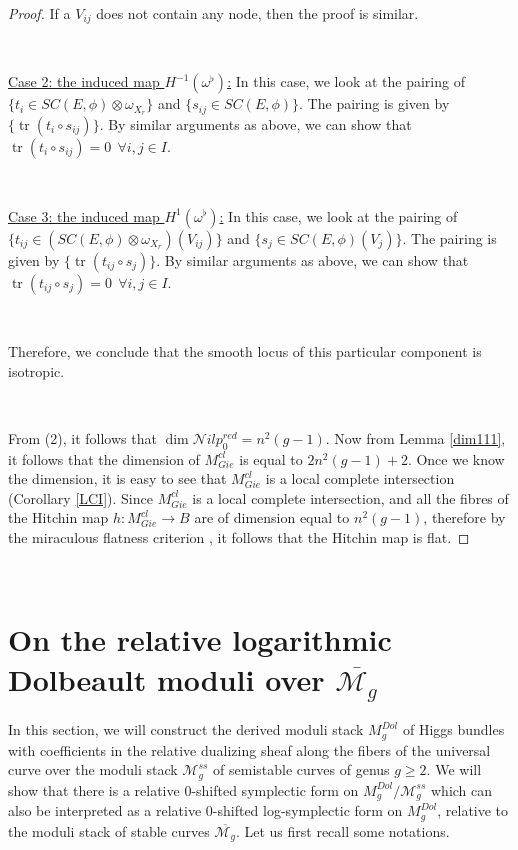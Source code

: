 \documentclass[11pt]{amsart}
\DeclareMathOperator{\tr}{tr}
\theoremstyle{plain}
\numberwithin{equation}{section}
\theoremstyle{definition}
\theoremstyle{plain}
\begin{document}
\begin{proof}
If a $V_{ij}$ does not contain any node, then the proof is similar. 

\

\underline{Case 2: the induced map $H^{-1}(\omega^{\flat})$:} In this case, we look at the pairing of $\{t_i\in SC(E, \phi)\otimes \omega_{X_r}\}$ and $\{s_{ij}\in SC(E, \phi)\}$. The pairing is given by $\{\tr(t_i\circ s_{ij})\}$. By similar arguments as above, we can show that $\tr(t_i\circ s_{ij})=0~~\forall i, j\in I$.

\

\underline{Case 3: the induced map $H^1(\omega^{\flat})$:} In this case, we look at the pairing of $\{t_{ij}\in (SC(E, \phi)\otimes \omega_{X_r})(V_{ij})\}$ and $\{s_j\in SC(E, \phi)(V_j)\}$. The pairing is given by $\{\tr(t_{ij}\circ s_j)\}$. By similar arguments as above, we can show that $\tr(t_{ij}\circ s_j)=0~~\forall i,j\in I$.

\

Therefore, we conclude that the smooth locus of this particular component is isotropic.

\

 From (2), it follows that $ \dim \mathcal Nilp^{red}_0= n^2(g-1)$. Now from Lemma \ref{dim111}, it follows that the dimension of $M^{cl}_{Gie}$ is equal to $2n^2(g-1)+2$. Once we know the dimension, it is easy to see that $M^{cl}_{Gie}$ is a local complete intersection (Corollary \ref{LCI}). Since $M^{cl}_{Gie}$ is a local complete intersection, and all the fibres of the Hitchin map $h: M^{cl}_{Gie}\longrightarrow B$ are of dimension equal to $n^2(g-1)$, therefore by the miraculous flatness criterion \cite[Exercise 10.9, page 276]{Ha}, it follows that the Hitchin map is flat.
\end{proof}

\

\section{\textbf{On the relative logarithmic Dolbeault moduli over \texorpdfstring{$\overline {\mathcal M_g}$}{Mgbar}}}
In this section, we will construct the derived moduli stack $M_{g}^{Dol}$ of Higgs bundles with coefficients in the relative dualizing sheaf along the fibers of the universal curve over the moduli stack $\mathcal{M}_{g}^{ss}$ of semistable curves of genus $g\geq 2$.  We will show that there is a relative $0$-shifted symplectic form on $M_{g}^{Dol}/\mathcal{M}_{g}^{ss}$ which can also be interpreted as a relative $0$-shifted log-symplectic form on $M_{g}^{Dol}$, relative to the moduli stack of stable curves $\overline{\mathcal{M}_{g}}$. Let us first recall some notations.
\end{document}
